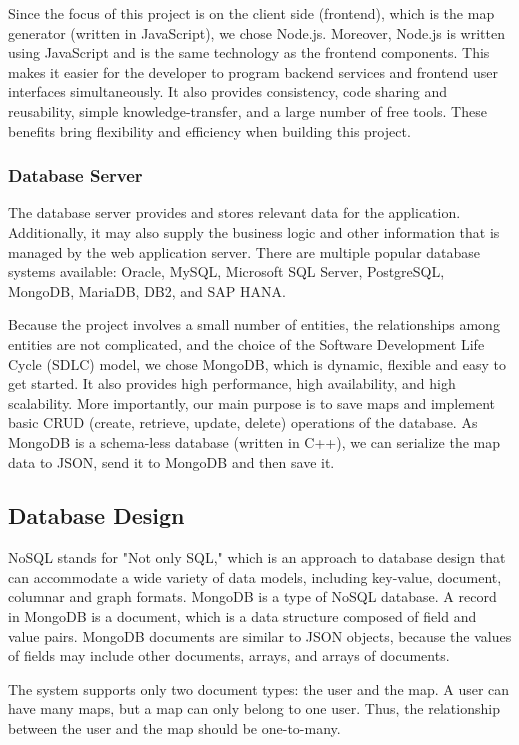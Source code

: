 Since the focus of this project is on the client side (frontend), which is the map generator (written in JavaScript), we chose Node.js. Moreover, Node.js is written using JavaScript and is the same technology as the frontend components. This makes it easier for the developer to program backend services and frontend user interfaces simultaneously. It also provides consistency, code sharing and reusability, simple knowledge-transfer, and a large number of free tools. These benefits bring flexibility and efficiency when building this project.

\subsubsection{Database Server}
\label{sec:Design>Architecture Design>Database Server}
The database server provides and stores relevant data for the application. Additionally, it may also supply the business logic and other information that is managed by the web application server. There are multiple popular database systems available: Oracle, MySQL, Microsoft SQL Server, PostgreSQL, MongoDB, MariaDB, DB2, and SAP HANA.

Because the project involves a small number of entities, the relationships among entities are not complicated, and the choice of the Software Development Life Cycle (SDLC) model, we chose MongoDB, which is dynamic, flexible and easy to get started. It also provides high performance, high availability, and high scalability. More importantly, our main purpose is to save maps and implement basic CRUD (create, retrieve, update, delete) operations of the database. As MongoDB is a schema-less database (written in C++), we can serialize the map data to JSON, send it to MongoDB and then save it.

\subsection{Database Design}
\label{sec:Design>Database Design}
NoSQL stands for "Not only SQL," which is an approach to database design that can accommodate a wide variety of data models, including key-value, document, columnar and graph formats. MongoDB is a type of NoSQL database. A record in MongoDB is a document, which is a data structure composed of field and value pairs. MongoDB documents are similar to JSON objects, because the values of fields may include other documents, arrays, and arrays of documents.

The system supports only two document types: the user and the map. A user can have many maps, but a map can only belong to one user. Thus, the relationship between the user and the map should be one-to-many.

